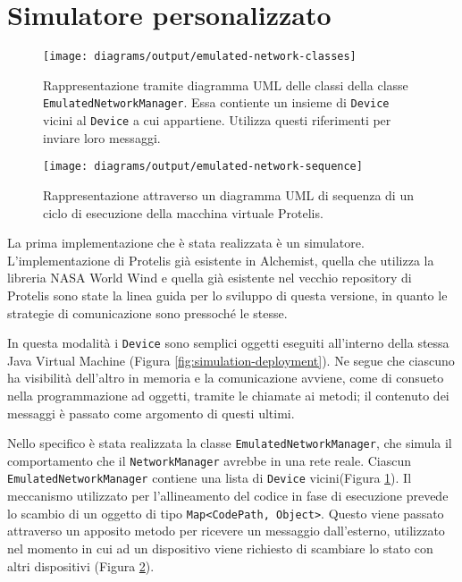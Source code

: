 \section{Simulatore personalizzato}
\begin{figure}
  \centering
  \texttt{[image: diagrams/output/emulated-network-classes]}
  \caption{Rappresentazione tramite diagramma UML delle classi della classe
    \texttt{EmulatedNetworkManager}. Essa contiente un insieme di
    \texttt{Device} vicini al \texttt{Device} a cui appartiene. Utilizza questi
    riferimenti per inviare loro messaggi.}
  \label{fig:emulated-network-classes}
\end{figure}
\begin{figure}
  \centering
  \texttt{[image: diagrams/output/emulated-network-sequence]}
  \caption{Rappresentazione attraverso un diagramma UML di sequenza di un ciclo di esecuzione della macchina virtuale Protelis.}
    \label{fig:emulated-network-sequence}
\end{figure}
La prima implementazione che è stata realizzata è un simulatore.
L'implementazione di Protelis già esistente in Alchemist, quella che utilizza
la libreria NASA World Wind e quella già esistente nel vecchio repository di
Protelis sono state la linea guida per lo sviluppo di questa versione, in
quanto le strategie di comunicazione sono pressoché le stesse.

In questa modalità i \texttt{Device} sono semplici oggetti eseguiti all'interno
della stessa Java Virtual Machine (Figura \ref{fig:simulation-deployment}). Ne
segue che ciascuno ha visibilità dell'altro in memoria e la comunicazione
avviene, come di consueto nella programmazione ad oggetti, tramite le chiamate
ai metodi; il contenuto dei messaggi è passato come argomento di questi ultimi.

Nello specifico è stata realizzata la classe \texttt{EmulatedNetworkManager},
che simula il comportamento che il \texttt{NetworkManager} avrebbe in una rete
reale. Ciascun \texttt{EmulatedNetworkManager} contiene una lista di
\texttt{Device} vicini(Figura \ref{fig:emulated-network-classes}). Il meccanismo
utilizzato per l'allineamento del codice in fase di esecuzione prevede lo
scambio di un oggetto di tipo \texttt{Map<CodePath, Object>}.
Questo viene passato attraverso un apposito metodo per ricevere un messaggio
dall'esterno, utilizzato nel momento in cui ad un dispositivo viene richiesto di
scambiare lo stato con altri dispositivi (Figura
\ref{fig:emulated-network-sequence}).

